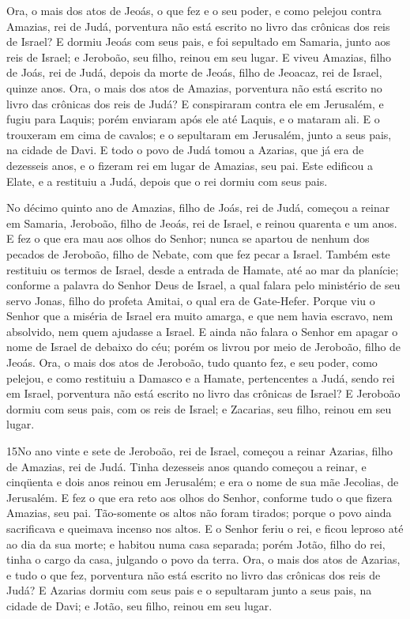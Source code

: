 Ora, o mais dos atos de Jeoás, o que fez e o seu poder, e como
pelejou contra Amazias, rei de Judá, porventura não está escrito no
livro das crônicas dos reis de Israel? E dormiu Jeoás com
seus pais, e foi sepultado em Samaria, junto aos reis de Israel; e
Jeroboão, seu filho, reinou em seu lugar. E viveu Amazias,
filho de Joás, rei de Judá, depois da morte de Jeoás, filho de
Jeoacaz, rei de Israel, quinze anos. Ora, o mais dos atos de
Amazias, porventura não está escrito no livro das crônicas dos reis
de Judá? E conspiraram contra ele em Jerusalém, e fugiu para
Laquis; porém enviaram após ele até Laquis, e o mataram ali.
E o trouxeram em cima de cavalos; e o sepultaram em
Jerusalém, junto a seus pais, na cidade de Davi. E todo o
povo de Judá tomou a Azarias, que já era de dezesseis anos, e o
fizeram rei em lugar de Amazias, seu pai. Este edificou a
Elate, e a restituiu a Judá, depois que o rei dormiu com seus pais.

No décimo quinto ano de Amazias, filho de Joás, rei de Judá,
começou a reinar em Samaria, Jeroboão, filho de Jeoás, rei de
Israel, e reinou quarenta e um anos. E fez o que era mau aos
olhos do Senhor; nunca se apartou de nenhum dos pecados de Jeroboão,
filho de Nebate, com que fez pecar a Israel. Também este
restituiu os termos de Israel, desde a entrada de Hamate, até ao mar
da planície; conforme a palavra do Senhor Deus de Israel, a qual
falara pelo ministério de seu servo Jonas, filho do profeta Amitai,
o qual era de Gate-Hefer. Porque viu o Senhor que a miséria
de Israel era muito amarga, e que nem havia escravo, nem absolvido,
nem quem ajudasse a Israel. E ainda não falara o Senhor em
apagar o nome de Israel de debaixo do céu; porém os livrou por meio
de Jeroboão, filho de Jeoás. Ora, o mais dos atos de
Jeroboão, tudo quanto fez, e seu poder, como pelejou, e como
restituiu a Damasco e a Hamate, pertencentes a Judá, sendo rei em
Israel, porventura não está escrito no livro das crônicas de Israel?
E Jeroboão dormiu com seus pais, com os reis de Israel; e
Zacarias, seu filho, reinou em seu lugar.

\medskip

\lettrine{15} No ano vinte e sete de Jeroboão, rei de Israel,
começou a reinar Azarias, filho de Amazias, rei de Judá. Tinha
dezesseis anos quando começou a reinar, e cinqüenta e dois anos
reinou em Jerusalém; e era o nome de sua mãe Jecolias, de Jerusalém.
E fez o que era reto aos olhos do Senhor, conforme tudo o que
fizera Amazias, seu pai. Tão-somente os altos não foram tirados;
porque o povo ainda sacrificava e queimava incenso nos altos. E
o Senhor feriu o rei, e ficou leproso até ao dia da sua morte; e
habitou numa casa separada; porém Jotão, filho do rei, tinha o cargo
da casa, julgando o povo da terra. Ora, o mais dos atos de
Azarias, e tudo o que fez, porventura não está escrito no livro das
crônicas dos reis de Judá? E Azarias dormiu com seus pais e o
sepultaram junto a seus pais, na cidade de Davi; e Jotão, seu filho,
reinou em seu lugar.

